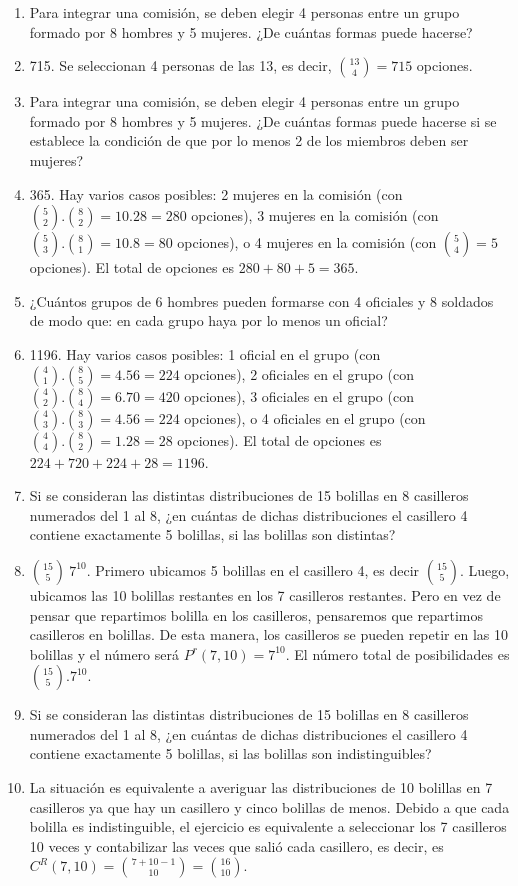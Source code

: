 \documentclass[a4paper]{article}
\newcommand{\answer}{\item[**]}
\begin{document}
\begin{enumerate}
\begin{enumerate} [label=(\alph*)]
		\item Para integrar una comisión, se deben elegir 4 personas entre un grupo formado por 8 hombres y 5 mujeres. ¿De cuántas formas puede hacerse?
		\answer 715. Se seleccionan 4 personas de las 13, es decir, $\binom{13}{4}=715$ opciones.

		\item Para integrar una comisión, se deben elegir 4 personas entre un grupo formado por 8 hombres y 5 mujeres. ¿De cuántas formas puede hacerse si se establece la condición de que por lo menos 2 de los miembros deben ser mujeres?
		\answer 365. Hay varios casos posibles: 2 mujeres en la comisión (con $\binom{5}{2}.\binom{8}{2}=10.28=280$ opciones), 3 mujeres en la comisión (con $\binom{5}{3}.\binom{8}{1}=10.8=80$ opciones), o 4 mujeres en la comisión (con $\binom{5}{4}=5$ opciones). El total de opciones es $280+80+5=365$.

		\item ¿Cuántos grupos de 6 hombres pueden formarse con 4 oficiales y 8 soldados de modo que: en cada grupo haya por lo menos un oficial?
		\answer 1196. Hay varios casos posibles: 1 oficial en el grupo (con $\binom{4}{1}.\binom{8}{5}=4.56=224$ opciones), 2 oficiales en el grupo (con $\binom{4}{2}.\binom{8}{4}=6.70=420$ opciones), 3 oficiales en el grupo (con $\binom{4}{3}.\binom{8}{3}=4.56=224$ opciones), o 4 oficiales en el grupo (con $\binom{4}{4}.\binom{8}{2}=1.28=28$ opciones). El total de opciones es $224+720+224+28=1196$. %

		\item Si se consideran las distintas distribuciones de 15 bolillas en 8 casilleros numerados del 1 al 8, ¿en cuántas de dichas distribuciones el casillero 4 contiene exactamente 5 bolillas, si las bolillas son distintas?
		\answer $\binom{15}{5}~7^{10}$. Primero ubicamos 5 bolillas en el casillero 4, es decir $\binom{15}{5}$. Luego, ubicamos las 10 bolillas restantes en los 7 casilleros restantes. Pero en vez de pensar que repartimos bolilla en los casilleros, pensaremos que repartimos casilleros en bolillas. De esta manera, los casilleros se pueden repetir en las 10 bolillas y el número será $P^r(7,10)=7^{10}$. El número total de posibilidades es $\binom{15}{5}.7^{10}$.

		\item Si se consideran las distintas distribuciones de 15 bolillas en 8 casilleros numerados del 1 al 8, ¿en cuántas de dichas distribuciones el casillero 4 contiene exactamente 5 bolillas, si las bolillas son indistinguibles?
		\answer La situación es equivalente a averiguar las distribuciones de 10 bolillas en 7 casilleros ya que hay un casillero y cinco bolillas de menos. Debido a que cada bolilla es indistinguible, el ejercicio es equivalente a seleccionar los 7 casilleros 10 veces y contabilizar las veces que salió cada casillero, es decir, es $C^R(7,10)=\binom{7+10-1}{10}=\binom{16}{10}$.


\end{enumerate}
\end{enumerate}
\end{document}
